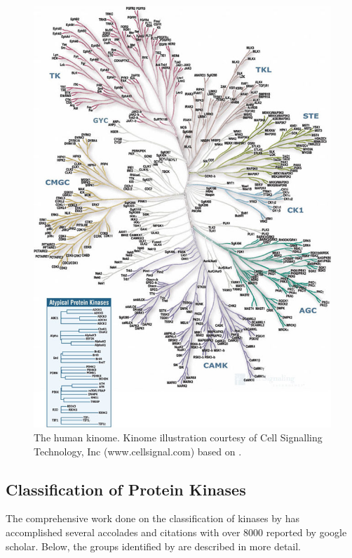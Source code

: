 \documentclass[a4paper, 11pt]{report}
\begin{document}
\begin{figure}[H]
	\includegraphics[width=\linewidth]{figures/kinome.jpg}
	\centering
	\caption{The human kinome. Kinome illustration courtesy of Cell Signalling 			Technology, Inc (www.cellsignal.com) based on \cite{manning2002protein}.}
	\label{KinomeDendogram}
\end{figure}
\subsection{Classification of Protein Kinases}
The comprehensive work done on the classification of kinases by \cite{manning2002protein} has accomplished several accolades and citations with over 8000 reported by google scholar. 
Below, the groups identified by \cite{manning2002protein} are described in more detail. \\
\end{document}
